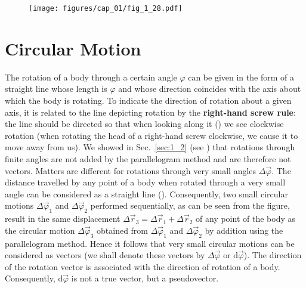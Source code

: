 \begin{figure}[t]
	\begin{center}
		\texttt{[image: figures/cap\_01/fig\_1\_28.pdf]}
		\caption[]{}
		\label{fig:1_28}
	\end{center}
	\vspace{-0.6cm}
\end{figure}


\section{Circular Motion}\label{sec:1_5}

The rotation of a body through a certain angle $\varphi$ can be given in the form of a straight line whose length is $\varphi$ and whose direction coincides with the axis about which the body is rotating. To indicate the direction of rotation about a given axis, it is related to the line depicting rotation by the \textbf{right-hand screw rule}: the line should be directed so that when looking along it () we see clockwise rotation (when rotating the head of a right-hand screw clockwise, we cause it to move away from us). We showed in Sec.~\ref{sec:1_2} (see ) that rotations through finite angles are not added by the parallelogram method and are therefore not vectors. Matters are different for rotations through very small angles $\Delta\vec{\varphi}$. The distance travelled by any point of a body when rotated through a very small angle can be considered as a straight line (). Consequently, two small circular motions $\Delta\vec{\varphi}_1$ and $\Delta\vec{\varphi}_2$ performed sequentially, as can be seen from the figure, result in the same displacement $\Delta\vec{r}_3=\Delta\vec{r}_1+\Delta\vec{r}_2$ of any point of the body as the circular motion $\Delta\vec{\varphi}_3$ obtained from $\Delta\vec{\varphi}_1$ and $\Delta\vec{\varphi}_2$ by addition using the parallelogram method. Hence it follows that very small circular motions can be considered as vectors (we shall denote these vectors by $\Delta\vec{\varphi}$ or $\mathrm{d}\vec{\varphi}$). The direction of the rotation vector is associated with the direction of rotation of a body. Consequently, $\mathrm{d}\vec{\varphi}$ is not a true vector, but a pseudovector.

